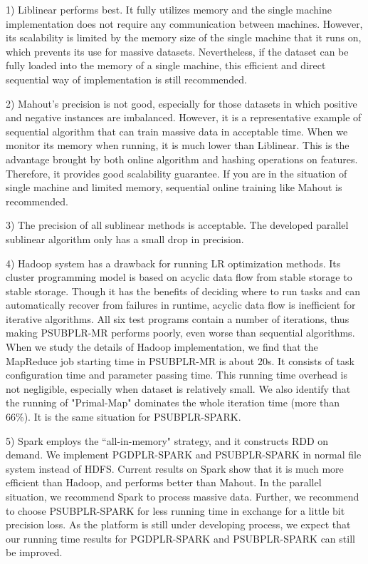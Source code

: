 \documentclass[10pt, conference, compsocconf]{IEEEtran}
\begin{document}
1) Liblinear performs best. It fully utilizes memory and the single machine implementation does not require any communication between machines.
          However, its scalability is limited by the memory size of the single machine that it runs on, which prevents its use for massive datasets.
          Nevertheless, if the dataset can be fully loaded into the memory of a single machine, this efficient and direct sequential way of implementation is still recommended.

2) Mahout's precision is not good, especially for those datasets in which positive and negative instances are imbalanced.
          However, it is a representative example of sequential algorithm that can train massive data in acceptable time.
          When we monitor its memory when running, it is much lower than Liblinear. This is the advantage brought by both online algorithm and hashing operations on features.
          Therefore, it provides good scalability guarantee. If you are in the situation of single machine and limited memory, sequential online training like Mahout is recommended.

3) The precision of all sublinear methods is acceptable. The developed parallel sublinear algorithm only has a small drop in precision.

4) Hadoop system has a drawback for running LR optimization methods. Its cluster programming model is based on acyclic data flow from stable storage to stable storage.
          Though it has the benefits of deciding where to run tasks and can automatically recover from failures in runtime, acyclic data flow is inefficient for iterative algorithms.
          All six test programs contain a number of iterations, thus making PSUBPLR-MR performs poorly, even worse than sequential algorithms.
          When we study the details of Hadoop implementation, we find that the MapReduce job starting time in PSUBPLR-MR is about 20s. It consists of task configuration time and parameter passing time.
          This running time overhead is not negligible, especially when dataset is relatively small.
          We also identify that the running of "Primal-Map" dominates the whole iteration time (more than 66\%). It is the same situation for PSUBPLR-SPARK.

5) Spark employs the ``all-in-memory" strategy, and it constructs RDD on demand. We implement PGDPLR-SPARK and PSUBPLR-SPARK in normal file system instead of HDFS.
          Current results on Spark show that it is much more efficient than Hadoop, and performs better than Mahout.
          In the parallel situation, we recommend Spark to process massive data. Further, we recommend to choose PSUBPLR-SPARK for less running time in exchange for a little bit precision loss.
          As the platform is still under developing process, we expect that our running time results for PGDPLR-SPARK and PSUBPLR-SPARK can still be improved.
\end{document}
